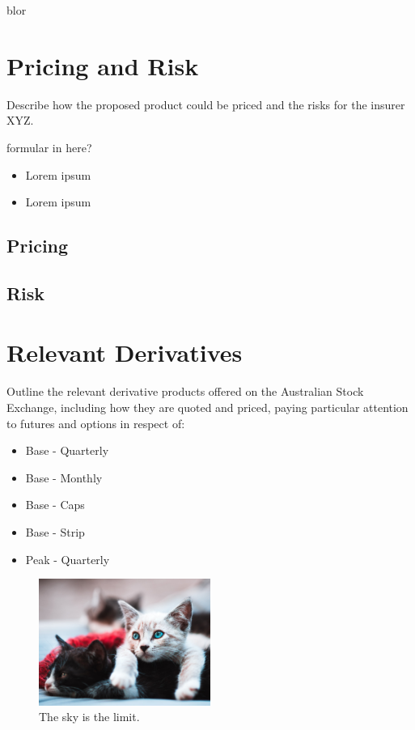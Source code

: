 \documentclass[12pt]{article}
\begin{document}
\fullboxbegin
blor
\fullboxend

\section{Pricing and Risk}
Describe how the proposed product could be priced and the risks for the insurer XYZ. 

\leftboxbegin
formular in here?
\leftboxend

\lipsum[1]

\rightboxbegin
\begin{itemize}
 \item Lorem ipsum
 \item Lorem ipsum
\end{itemize}
\rightboxend

\lipsum[1]

\subsection{Pricing}
\lipsum[1]

\subsection{Risk}
\lipsum[1]


\section{Relevant Derivatives}
Outline the relevant derivative products offered on the Australian Stock Exchange, including how they are quoted and priced, paying particular attention to futures and options in respect of: 
\begin{itemize}
 \item Base - Quarterly
 \item Base - Monthly
 \item Base - Caps
 \item Base - Strip
 \item Peak - Quarterly
\end{itemize}

\begin{figure}[!h]
\centering
\includegraphics[width=0.5\textwidth]{opening.jpg}
\caption*{The sky is the limit.}
\end{figure}
\end{document}
